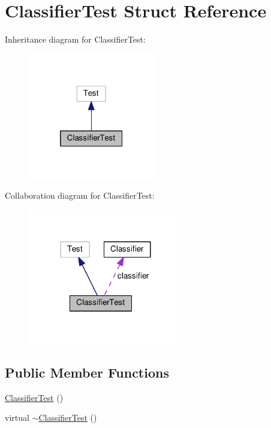 \hypertarget{structClassifierTest}{}\section{Classifier\+Test Struct Reference}
\label{structClassifierTest}


Inheritance diagram for Classifier\+Test\+:
\nopagebreak
\begin{figure}[H]
\begin{center}
\leavevmode
\includegraphics[width=157pt]{structClassifierTest__inherit__graph}
\end{center}
\end{figure}


Collaboration diagram for Classifier\+Test\+:
\nopagebreak
\begin{figure}[H]
\begin{center}
\leavevmode
\includegraphics[width=192pt]{structClassifierTest__coll__graph}
\end{center}
\end{figure}
\subsection*{Public Member Functions}
\begin{DoxyCompactItemize}
\item 
\hyperlink{structClassifierTest_a44a8a84b2e0d51b914950a6333a13df7}{Classifier\+Test} ()
\item 
virtual \hyperlink{structClassifierTest_a12a8dd361b48330be8b4fedbd7570ea7}{$\sim$\+Classifier\+Test} ()
\end{DoxyCompactItemize}
